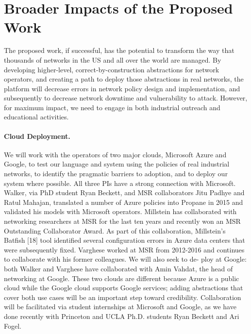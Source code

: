 \section{Broader Impacts of the Proposed Work}
\label{sec:impact}

The proposed work, if successful, has the potential to transform the way
that thousands of networks in the US and all over the world are managed.
By developing higher-level, correct-by-construction abstractions for
network operators, and creating a path to deploy those abstractions
in real networks, the \Name platform will decrease
errors in network policy design and implementation, and subsequently
to decrease network downtime and vulnerability to attack.  However,
for maximum impact, we need to engage in both industrial outreach and
educational activities.

\paragraph*{Cloud Deployment.} 
We will work with the operators of two major clouds, Microsoft Azure and Google, to test our language and system using the policies of real industrial networks, to identify the pragmatic barriers to adoption, and to deploy our system where possible.
All three PIs have a strong connection with Microsoft. Walker, via PhD student Ryan Beckett, and MSR collaborators Jitu Padhye and Ratul Mahajan, translated a number of Azure policies into Propane in 2015 and validated his models with Microsoft operators. Millstein has collaborated with networking researchers at MSR for the last ten years and recently won an MSR Outstanding Collaborator Award. As part of this collaboration, Millstein’s Batfish [18] tool identified several configuration errors in Azure data centers that were subsequently fixed. Varghese worked at MSR from 2012-2016 and continues to collaborate with his former colleagues. We will also seek to de- ploy at Google: both Walker and Varghese have collaborated with Amin Vahdat, the head of networking at Google. These two clouds are different because Azure is a public cloud while the Google cloud supports Google services; adding abstractions that cover both use cases will be an important step toward credibility. Collaboration will be facilitated via student internships at Microsoft and Google, as we have done recently with Princeton and UCLA Ph.D. students Ryan Beckett and Ari Fogel.

